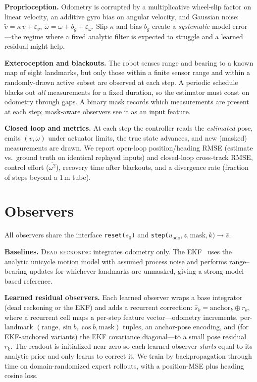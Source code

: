 \documentclass[10pt]{article}
\newcommand{\obs}[1]{\textsc{#1}}
\begin{document}
\textbf{Proprioception.} Odometry is corrupted by a multiplicative wheel-slip factor on linear
velocity, an additive gyro bias on angular velocity, and Gaussian noise:
$\tilde v = \kappa\, v + \varepsilon_v,\ \tilde\omega = \omega + b_g + \varepsilon_\omega$.
Slip $\kappa$ and bias $b_g$ create a \emph{systematic} model error---the regime where a fixed
analytic filter is expected to struggle and a learned residual might help.

\textbf{Exteroception and blackouts.} The robot senses range and bearing to a known map of eight
landmarks, but only those within a finite sensor range and within a randomly-drawn active subset
are observed at each step. A periodic schedule blacks out \emph{all} measurements for a fixed
duration, so the estimator must coast on odometry through gaps. A binary mask records which
measurements are present at each step; mask-aware observers see it as an input feature.

\textbf{Closed loop and metrics.} At each step the controller reads the \emph{estimated} pose,
emits $(v,\omega)$ under actuator limits, the true state advances, and new (masked) measurements
are drawn. We report open-loop position/heading RMSE (estimate vs.\ ground truth on identical
replayed inputs) and closed-loop cross-track RMSE, control effort ($\overline{\omega^2}$), recovery
time after blackouts, and a divergence rate (fraction of steps beyond a $1$\,m tube).

\section{Observers}
All observers share the interface \texttt{reset($s_0$)} and \texttt{step($u_{\text{odo}},z,\text{mask},k)\!\to\!\hat s$}.

\textbf{Baselines.} \obs{Dead reckoning} integrates odometry only. The \obs{EKF}~\cite{thrun} uses
the analytic unicycle motion model with assumed process noise and performs range--bearing updates
for whichever landmarks are unmasked, giving a strong model-based reference.

\textbf{Learned residual observers.} Each learned observer wraps a base integrator (dead reckoning
or the EKF) and adds a recurrent correction: $\hat s_k = \text{anchor}_k \oplus r_k$, where a
recurrent cell maps a per-step feature vector---odometry increments, per-landmark
$(\text{range},\sin b,\cos b,\text{mask})$ tuples, an anchor-pose encoding, and (for EKF-anchored
variants) the EKF covariance diagonal---to a small pose residual $r_k$. The readout is initialized
near zero so each learned observer \emph{starts} equal to its analytic prior and only learns to
correct it. We train by backpropagation through time on domain-randomized expert rollouts, with a
position-MSE plus heading cosine loss.
\end{document}
